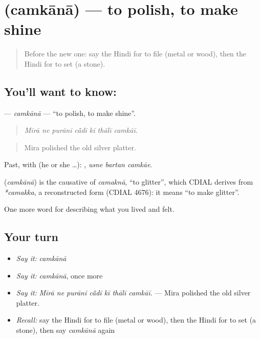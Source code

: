 \section[\texorpdfstring{\hi{चमकाना} (camkānā)}{चमकाना (camkānā)}]{ (camkānā) — to polish, to make shine}

\label{lesson:HI-C514-camkana}



\begin{quote}
Before the new one: say the Hindi for to file (metal or wood), then the Hindi for to set (a stone).
\end{quote}

\subsection*{You'll want to know: }
\textbf{} — \emph{camkānā} — \textquotedblleft{}to polish, to make shine\textquotedblright{}.

\begin{quote}
      
\end{quote}

\begin{quote}
\emph{Mīrā ne purānī cā̃dī kī thālī camkāī.}
\end{quote}

\begin{quote}
Mira polished the old silver platter.
\end{quote}

Past, with  (he or she …):   , \emph{usne bartan camkāe}.

\begin{cousinweb}
\textbf{} (\emph{camkānā}) is the causative of \emph{camaknā}, \textquotedblleft{}to glitter\textquotedblright{}, which CDIAL derives from \emph{*camakka}, a reconstructed form (CDIAL 4676): it means \textquotedblleft{}to make glitter\textquotedblright{}.
\end{cousinweb}

\begin{grammarlens}[title={What you've built}]
One more word for describing what you lived and felt.
\end{grammarlens}

\subsection*{Your turn}
\begin{itemize}
\raggedright
  \item \emph{Say it:} \emph{camkānā}
  \item \emph{Say it:} \emph{camkānā}, once more
  \item \emph{Say it:} \emph{Mīrā ne purānī cā̃dī kī thālī camkāī.} — Mira polished the old silver platter.
  \item \emph{Recall:} say the Hindi for to file (metal or wood), then the Hindi for to set (a stone), then say \emph{camkānā} again
\end{itemize}

